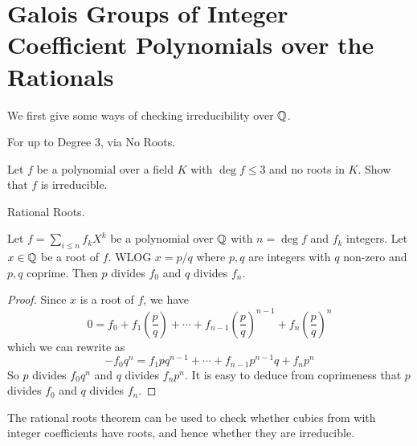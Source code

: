 \documentclass[../book.tex]{subfiles}
\begin{document}
\section{Galois Groups of Integer Coefficient Polynomials over the Rationals}

We first give some ways of checking irreducibility over $\mathbb{Q}$.

\begin{ex} For up to Degree 3, via No Roots.
    
    Let $f$ be a polynomial over a field $K$
    with $\deg f \leq 3$ and no roots in $K$. 
    Show that $f$ is irreducible.
    
\end{ex}
\begin{thm} Rational Roots.
    
    Let $f = \sum_{i \leq n} f_k X^k$ be a polynomial over $\mathbb{Q}$ 
    with $n = \deg f$ and $f_k$ integers. 
    Let $x \in \mathbb{Q}$ be a root of $f$. 
    WLOG $x = p/q$ where $p, q$ are integers with $q$ non-zero and $p, q$ coprime. 
    Then $p$ divides $f_0$ and $q$ divides $f_{n}$. 
    
\end{thm}
\begin{proof}
    
    Since $x$ is a root of $f$, we have \[
        0 = f_0 + f_1 \left( \frac{p}{q} \right) + \cdots 
        + f_{n-1} \left( \frac{p}{q} \right)^{n-1}
        + f_n \left( \frac{p}{q} \right)^n
    \]
    which we can rewrite as    
    \[
        - f_0 q^{n} = f_1 p q^{n - 1} + \cdots 
        + f_{n - 1} p^{n - 1} q + f_{n} p^{n}
    \]
    So $p$ divides $f_0 q^n$ and $q$ divides $f_n p^n$. 
    It is easy to deduce from coprimeness that 
    $p$ divides $f_0$ and $q$ divides $f_n$.
    
\end{proof}

\begin{rmk}
    
    The rational roots theorem can be used to check 
    whether cubics from with integer coefficients have roots,
    and hence whether they are irreducible. 
    
\end{rmk}
\end{document}
